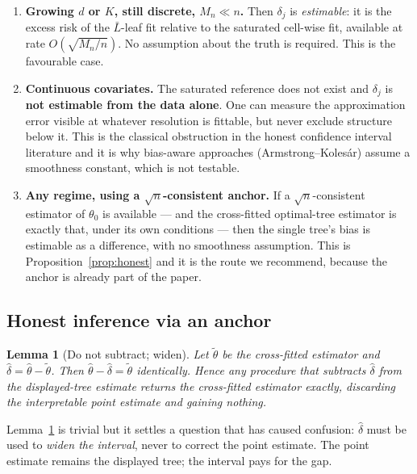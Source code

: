 \documentclass[11pt]{article}
\theoremstyle{plain}
\newtheorem{lemma}{Lemma}
\theoremstyle{definition}
\theoremstyle{remark}
\newcommand{\thetahat}{\widehat{\theta}}
\begin{document}
\begin{enumerate}[leftmargin=*,label=(\alph*)]
  \item \textbf{Growing $d$ or $K$, still discrete, $M_n\ll n$.} Then $\delta_j$
  is \emph{estimable}: it is the excess risk of the $\bar L$-leaf fit relative to
  the saturated cell-wise fit, available at rate $O(\sqrt{M_n/n})$. No assumption
  about the truth is required. This is the favourable case.
  \item \textbf{Continuous covariates.} The saturated reference does not exist and
  $\delta_j$ is \textbf{not estimable from the data alone}. One can measure the
  approximation error visible at whatever resolution is fittable, but never
  exclude structure below it. This is the classical obstruction in the honest
  confidence interval literature and it is why bias-aware approaches
  (Armstrong--Koles\'ar) assume a smoothness constant, which is not testable.
  \item \textbf{Any regime, using a $\sqrt n$-consistent anchor.} If a
  $\sqrt n$-consistent estimator of $\theta_0$ is available --- and the
  cross-fitted optimal-tree estimator is exactly that, under its own conditions
  --- then the single tree's bias is estimable as a difference, with no smoothness
  assumption. This is Proposition~\ref{prop:honest} and it is the route we
  recommend, because the anchor is already part of the paper.
\end{enumerate}

\subsection{Honest inference via an anchor}

\begin{lemma}[Do not subtract; widen]\label{lem:no-subtract}
Let $\widetilde\theta$ be the cross-fitted estimator and
$\widehat\delta = \thetahat-\widetilde\theta$. Then
$\thetahat-\widehat\delta = \widetilde\theta$ identically. Hence any procedure
that \emph{subtracts} $\widehat\delta$ from the displayed-tree estimate returns
the cross-fitted estimator exactly, discarding the interpretable point estimate
and gaining nothing.
\end{lemma}

Lemma~\ref{lem:no-subtract} is trivial but it settles a question that has caused
confusion: $\widehat\delta$ must be used to \emph{widen the interval}, never to
correct the point estimate. The point estimate remains the displayed tree; the
interval pays for the gap.
\end{document}
